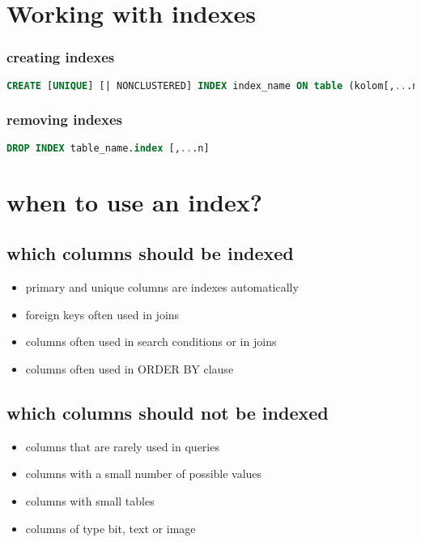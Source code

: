 \documentclass{report}
\begin{document}
		\section{Working with indexes}
			\subsubsection{creating indexes}
			\begin{lstlisting}[language = sql]
CREATE [UNIQUE] [| NONCLUSTERED] INDEX index_name ON table (kolom[,...n])\end{lstlisting}
			\subsubsection{removing indexes}
				\begin{lstlisting}[language = sql]
DROP INDEX table_name.index [,...n]\end{lstlisting}
		\section{when to use an index?}
			\subsection{which columns should be indexed}
				\begin{itemize}
					\item primary and unique columns are indexes automatically
					\item foreign keys often used in joins
					\item columns often used in search conditions or in joins
					\item columns often used in ORDER BY clause
				\end{itemize}
			\subsection{which columns should not be indexed}
				\begin{itemize}
					\item columns that are rarely used in queries
					\item columns with a small number of possible values
					\item columns with small tables
					\item columns of type bit, text or image
				\end{itemize}
\end{document}
